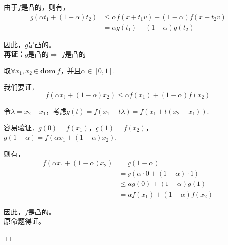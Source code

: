 \documentclass[10pt, a4paper]{article}
\begin{document}
由于$f$是凸的，则有，
\begin{equation*}
    \begin{aligned}
    g\left(\alpha t_{1}+(1-\alpha) t_{2}\right) & \leq \alpha f\left(x+t_{1} v\right)+(1-\alpha) f\left(x+t_{2} v\right) \\
    &=\alpha g\left(t_{1}\right)+(1-\alpha) g\left(t_{2}\right)
    \end{aligned}
\end{equation*}

因此，$g$是凸的。\\

\textbf{再证：}$g$是凸的$\Longrightarrow$ $f$是凸的

取$\forall x_{1} ,x_{2} \in \mathbf{dom}\ f$，并且$\alpha  \in \left [ 0,1 \right ]$.

我们要证，\[f\left(\alpha x_{1}+(1-\alpha) x_{2}\right) \leq \alpha f\left(x_{1}\right)+(1-\alpha) f\left(x_{2}\right) \]

令$\lambda =x_{2}-x_{1}$，考虑$g\left(t\right)=f\left(x_{1}+t\lambda \right)=f\left(x_{1}+t\left(x_{2}-x_{1}\right)\right)$.

容易验证，$g\left(0\right)=f\left(x_{1}\right)$，$g\left(1\right)=f\left(x_{2}\right)$，$g\left(1-\alpha \right)=f\left(\alpha x_{1}+\left(1-\alpha \right)x_{2}\right)$.

则有，
\begin{equation*}
\begin{aligned}
    f(\alpha x_{1}+(1-\alpha) x_{2}) &=g(1-\alpha) \\
    &=g(\alpha \cdot 0+(1-\alpha) \cdot 1) \\
    & \leq \alpha g(0)+(1-\alpha) g(1) \\
    &=\alpha f(x_{1})+(1-\alpha) f(x_{2})
    \end{aligned}
\end{equation*}

因此，$f$是凸的。\\

原命题得证。

\hfill $\Box$ 
\end{document}
